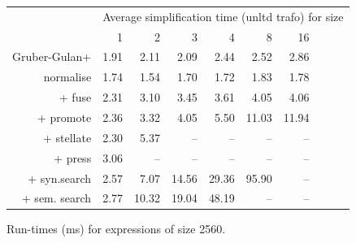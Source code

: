 \begin{figure}\begin{tabular}{rrrrrrrrrr}
 & \multicolumn{9}{c}{Average simplification time (unltd trafo) for size} \\
 & 1 & 2 & 3 & 4 & 8 & 16 \\
Gruber-Gulan+ & 1.91 & 2.11 & 2.09 & 2.44 & 2.52 & 2.86 \\
normalise & 1.74 & 1.54 & 1.70 & 1.72 & 1.83 & 1.78 \\
+ fuse & 2.31 & 3.10 & 3.45 & 3.61 & 4.05 & 4.06 \\
+ promote & 2.36 & 3.32 & 4.05 & 5.50 & 11.03 & 11.94 \\
+ stellate & 2.30 & 5.37 & -- & -- & -- & -- \\
+ press & 3.06 & -- & -- & -- & -- & -- \\
+ syn.search & 2.57 & 7.07 & 14.56 & 29.36 & 95.90 & -- \\
+ sem. search & 2.77 & 10.32 & 19.04 & 48.19 & -- & -- \\
\end{tabular}\caption{Run-times (ms) for expressions of size 2560.}\end{figure}
